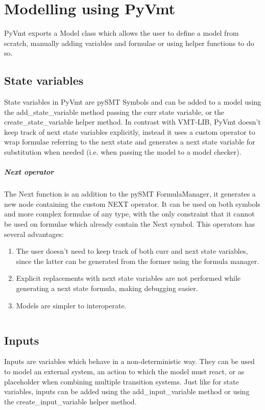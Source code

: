 \chapter{Modelling using PyVmt}
PyVmt exports a Model class which allows the user to define a model from scratch, manually adding variables and formulae or using helper functions to do so.

\section{State variables}
State variables in PyVmt are pySMT Symbols and can be added to a model using the add\_state\_variable method passing the curr state variable, or the create\_state\_variable helper method.
In contrast with VMT-LIB, PyVmt doesn't keep track of next state variables explicitly, instead it uses a custom operator to wrap formulae referring to the next state and generates a next state variable for substitution when needed (i.e. when passing the model to a model checker).

\paragraph*{Next operator} The Next function is an addition to the pySMT FormulaManager, it generates a new node containing the custom NEXT operator. It can be used on both symbols and more complex formulae of any type, with the only constraint that it cannot be used on formulae which already contain the Next symbol. This operators has several advantages:
\begin{enumerate}
    \item The user doesn't need to keep track of both curr and next state variables, since the latter can be generated from the former using the formula manager.
    \item Explicit replacements with next state variables are not performed while generating a next state formula, making debugging easier.
    \item Models are simpler to interoperate.
\end{enumerate}

\inputminted[firstline=1, lastline=19]{python}{py/modelling.py}

\section{Inputs}
Inputs are variables which behave in a non-deterministic way. They can be used to model an external system, an action to which the model must react, or as placeholder when combining multiple transition systems.
Just like for state variables, inputs can be added using the add\_input\_variable method or using the create\_input\_variable helper method.

